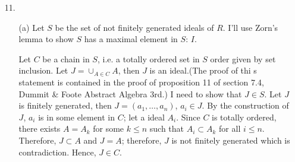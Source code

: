 \documentclass[12pt]{article}
\begin{document}
\begin{enumerate}
\begin{proof}
Let $\frac{1}{p(x)}\in k(x)=\left(\frac{a_1(x)}{b_1(x)},\frac{a_2(x)}{b_2(x)},\ldots, \frac{a_n(x)}{b_n(x)}\right)$, then $\frac{1}{p(x)}\in k\left[\frac{a_1(x)}{b_1(x)},\frac{a_2(x)}{b_2(x)},\ldots, \frac{a_n(x)}{b_n(x)}\right]$. Since $\frac{1}{p(x)}$ is not constant, and right hand side is polynomial, it would be written as $\frac{r(x)}{t(x)}$ for some $r(x),t(x)\in k[x]$. Note that $t(x)$ is at least degree 1 polynomial having a irreducible factor in $p_{ij}(x)$ for some $i,j$.... To meet $\frac{1}{p(x)}=\frac{r(x)}{t(x)}$, $t(x)=p(x)r(x)$ but it means  $r(x)$ is divided by $p(x)$ which is contradiction to assumption. Therefore, $k(x)$ is not finitely generated k-algebra
\end{proof}
\item[11.]\begin{enumerate}
\item[(a)] Let $S$ be the set of not finitely generated ideals of $R$. I'll use Zorn's lemma to show $S$ has a maximal element in $S$: $I$.

Let $C$ be a chain in $S$, i.e. a totally ordered set in $S$ order given by set inclusion. Let $J=\cup_{A\in C} A$, then $J$ is an ideal.(The proof of thi s statement is contained in the proof of proposition 11 of section 7.4, Dummit \& Foote Abstract Algebra 3rd.) I need to show that $J\in S$. Let $J$ is finitely generated, then $J=(a_1, \ldots, a_n)$, $a_i\in J$. By the construction of $J$, $a_i$ is in some element in $C$; let a ideal $A_i$. Since $C$ is totally ordered, there exists $A=A_k$ for some $k\leq n$ such that $A_i\subset A_k$ for all $i\leq n$. Therefore, $J\subset A$ and $J=A$; therefore, $J$ is not finitely generated which is contradiction. Hence, $J\in C$.


\end{enumerate}
\end{enumerate}
\end{document}

